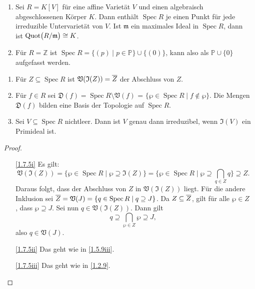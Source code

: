 \documentclass[a4paper,12pt,index=toc]{scrbook}
\theoremstyle{keinenummern} %
\def\V{\mathfrak{V}}
\def\I{\mathfrak{I}}
\def\P{\mathbb{P}}
\newcommand{\D}{\mathfrak{D}}
\def\m{\mathfrak{m}}
\newcommand{\Spec}{\operatorname{Spec}}
\newcommand{\Quot}{\operatorname{Quot}}
\newcommand{\set}[1]{\ensuremath{\mathbb{#1}}}
\newcommand{\Z}{\set{Z}}
\def\Bar#1{\ensuremath\overline{#1}}
\begin{document}
\begin{bsp}\label{1.7.4}
  \begin{enumerate}
  \item{} Sei $R=K[V]$ für eine affine Varietät $V$ und einen algebraisch abgeschlossenen Körper $K$. Dann enthält
    $\Spec R$ je einen Punkt für jede irreduzible Untervarietät von $V$. Ist $\m$ ein maximales Ideal in $\Spec R$, dann ist
    $\Quot\bigl(\Quotient{R}{\m}\bigr)\cong K$.
  \item{} Für $R=\Z$ ist $\Spec R = \{(p)\mid p\in\P\}\cup\{(0)\}$, kann also als $\P\cup\{0\}$ aufgefasst werden.
  \end{enumerate}
\end{bsp}

\begin{bem}\label{1.7.5}
  \begin{enumerate}
  \item{} Für $Z\subseteq\Spec R$ ist $\V(\I(Z))=\Bar{Z}$ der Abschluss von $Z$.
  \item{} Für $f\in R$ sei $\D(f)=\Spec R\setminus\V(f)$ = $\{\wp\in\Spec R\mid f\notin \wp\}$. Die Mengen $\D(f)$
    bilden eine Basis der Topologie auf $\Spec R$.
  \item{} Sei $V\subseteq\Spec R$ nichtleer. Dann ist $V$ genau dann irreduzibel, wenn $\I(V)$ ein Primideal ist.
  \end{enumerate}
\end{bem}
\begin{proof}
  \begin{enumerate}
  \item[\ref{1.7.5i}] Es gilt:\vspace*{-6pt}
  \begin{equation*}\V(\I(Z))=\{\wp\in\Spec R\mid \wp\supseteq\I(Z)\} = \{\wp\in\Spec R\mid \wp\supseteq\bigcap_{q\in Z}q\}\supseteq Z.\end{equation*}
    Daraus folgt, dass der Abschluss von $Z$ in $\V(\I(Z))$ liegt. Für die andere Inklusion sei
    $\Bar{Z}=\V(J)=\{q\in\Spec R\mid q\supseteq J\}$. Da $Z\subseteq\Bar{Z}$, gilt für alle $\wp\in Z$, dass $\wp\supseteq J$. Sei
    nun $q\in\V(\I(Z))$. Dann gilt \begin{equation*}q\supseteq\bigcap_{\wp\in Z}\wp\supseteq J,\end{equation*} also $q\in\V(J)$.
  \item[\ref{1.7.5ii}] Das geht wie in \cref{1.5.9iii}.
  \item[\ref{1.7.5iii}] Das geht wie in \cref{1.2.9}.
  \end{enumerate}
\end{proof}
\end{document}
